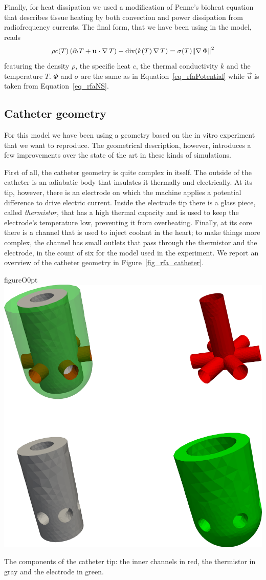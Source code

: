 Finally, for heat dissipation we used a modification of Penne's bioheat equation that describes tissue heating by both convection and power dissipation from radiofrequency currents.
The final form, that we have been using in the model, reads
\begin{equation}
  \rho c(T) \left( \partial_{t} T + \vec{u} \cdot \grad T\right) - \div(k(T) \grad T) = \sigma(T) \norm*{\grad \Phi}^2
  \label{eq_rfaBioheat}
\end{equation}
featuring the density \(\rho\), the specific heat \(c\), the thermal conductivity \(k\) and the temperature \(T\).
\(\Phi\) and \(\sigma\) are the same as in Equation~\eqref{eq_rfaPotential} while \(\vec{u}\) is taken from Equation~\eqref{eq_rfaNS}.

\subsection{Catheter geometry}
\label{sub_rfaGeometry}
For this model we have been using a geometry based on the in vitro experiment that we want to reproduce.
The geometrical description, however, introduces a few improvements over the state of the art in these kinds of simulations.

First of all, the catheter geometry is quite complex in itself.
The outside of the catheter is an adiabatic body that insulates it thermally and electrically.
At its tip, however, there is an electrode on which the machine applies a potential difference to drive electric current.
Inside the electrode tip there is a glass piece, called \emph{thermistor}, that has a high thermal capacity and is used to keep the electrode's temperature low, preventing it from overheating.
Finally, at its core there is a channel that is used to inject coolant in the heart; to make things more complex, the channel has small outlets that pass through the thermistor and the electrode, in the count of six for the model used in the experiment.
We report an overview of the catheter geometry in Figure~\ref{fig_rfa_catheter}.
\begin{wrapfloat}{figure}{O}{0pt}
  \centering
    \includegraphics[width=0.5\columnwidth]{img/rfa/catheter}
    \caption{The components of the catheter tip: the inner channels in red, the thermistor in gray and the electrode in green.}
    \label{fig_rfa_catheter}
\end{wrapfloat}

